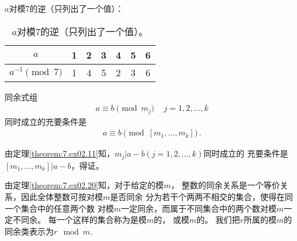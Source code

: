\begin{example}
    $a$对模7的逆（只列出了一个值）：
    \begin{table}[htbp]
        \centering
        \begin{tabular}{c|cccccc}
            \toprule
            $a$              & 1 & 2 & 3 & 4 & 5 & 6 \\
            \midrule
            $a^{-1}\pmod{7}$ & 1 & 4 & 5 & 2 & 3 & 6 \\
            \bottomrule
        \end{tabular}
        \caption{$a$对模7的逆（只列出了一个值）。}
        \label{tab:7.ex02.modularinverse}
    \end{table}
\end{example}

\begin{theorem}\label{theorem:7.ex02.25}
    同余式组
    \begin{align}
        a\equiv b\pmod{m_j}\, \quad j=1,2,\ldots,k
    \end{align}
    同时成立的充要条件是
    \begin{align}
        a\equiv b\pmod{[m_1,\ldots,m_k]}\, .
    \end{align}
\end{theorem}
\begin{prove}
    由定理\ref{theorem:7.ex02.11}知，$m_j|a-b(j=1,2,\ldots,k)$同时成立的
    充要条件是$[m_1,\ldots,m_k]|a-b$，得证。
\end{prove}
\begin{definition}
    由定理\ref{theorem:7.ex02.20}知，对于给定的模$m$，
    整数的同余关系是一个等价关系，因此全体整数可按对模$m$是否同余
    分为若干个两两不相交的集合，使得在同一个集合中的任意两个数
    对模$m$一定同余，而属于不同集合中的两个数对模$m$一定不同余。
    每一个这样的集合称为是模$m$的，
    或模$m$的。
    我们把$r$所属的模$m$的同余类表示为$r\mod{m}$.
\end{definition}

